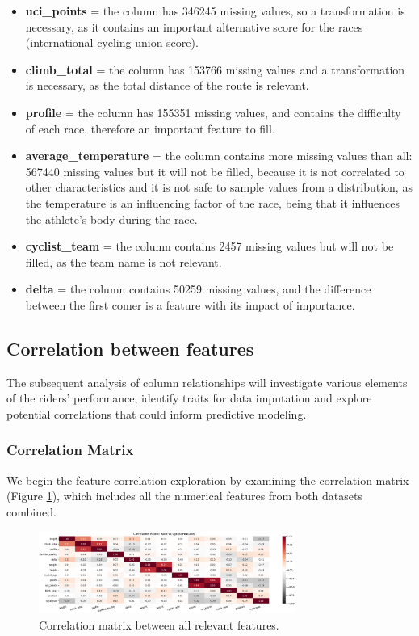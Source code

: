 \documentclass[a4paper, twoside]{article}
\begin{document}
\begin{itemize}[noitemsep]

    \item \textbf{uci\_points} = the column has 346245 missing values, so a transformation is necessary, as it contains an important alternative score for the races (international cycling union score).

    \item \textbf{climb\_total} = the column has 153766 missing values and a transformation is necessary, as the total distance of the route is relevant.

    \item \textbf{profile} = the column has 155351 missing values, and contains the difficulty of each race, therefore an important feature to fill.

    \item \textbf{average\_temperature} = the column contains more missing values than all: 567440 missing values but it will not be filled, because it is not correlated to other characteristics and it is not safe to sample values from a distribution, as the temperature is an influencing factor of the race, being that it influences the athlete's body during the race.

    \item \textbf{cyclist\_team} = the column contains 2457 missing values but will not be filled, as the team name is not relevant.

    \item \textbf{delta} = the column contains 50259 missing values, and the difference between the first comer is a feature with its impact of importance.

\end{itemize}

\subsection{Correlation between features}
The subsequent analysis of column relationships will investigate various elements of the riders' performance, identify traits for data imputation and explore potential correlations that could inform predictive modeling.
\subsubsection{Correlation Matrix}
We begin the feature correlation exploration by examining the correlation matrix (Figure \ref{fig:correlation-matrix}), which includes all the numerical features from both datasets combined.
\begin{figure}[ht]
    \centering
    \includegraphics[width=0.75\textwidth]{assets/correlation_matrix.png}
    \caption{Correlation matrix between all relevant features.}
    \label{fig:correlation-matrix}
\end{figure}
\end{document}
